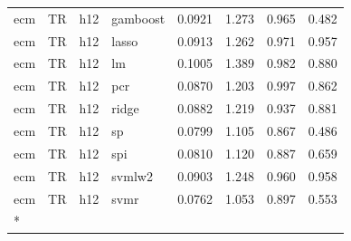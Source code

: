 \begin{ThreePartTable}
\begin{longtable}[t]{llclcccc}
ecm & TR & h12 & gamboost & 0.0921 & 1.273 & 0.965 & 0.482\\
ecm & TR & h12 & lasso & 0.0913 & 1.262 & 0.971 & 0.957\\
ecm & TR & h12 & lm & 0.1005 & 1.389 & 0.982 & 0.880\\
ecm & TR & h12 & pcr & 0.0870 & 1.203 & 0.997 & 0.862\\
ecm & TR & h12 & ridge & 0.0882 & 1.219 & 0.937 & 0.881\\
ecm & TR & h12 & sp & 0.0799 & 1.105 & 0.867 & 0.486\\
ecm & TR & h12 & spi & 0.0810 & 1.120 & 0.887 & 0.659\\
ecm & TR & h12 & svmlw2 & 0.0903 & 1.248 & 0.960 & 0.958\\
ecm & TR & h12 & svmr & 0.0762 & 1.053 & 0.897 & 0.553\\*
\end{longtable}
\end{ThreePartTable}
\endgroup{}
